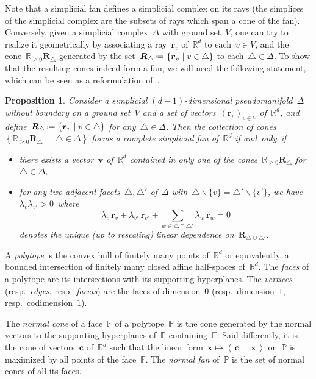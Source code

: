 \documentclass{amsart}
\newtheorem{proposition}[theorem]{Proposition}
\theoremstyle{definition}
\newcommand{\R}{\mathbb{R}} %
\renewcommand{\b}[1]{{\boldsymbol{#1}}} %
\newcommand{\set}[2]{\left\{ #1 \;\middle|\; #2 \right\}} %
\newcommand{\ssm}{\smallsetminus} %
\newcommand{\dotprod}[2]{\left\langle \, #1 \; \middle| \; #2 \, \right\rangle} %
\newcommand{\eqdef}{\mbox{\,\raisebox{0.2ex}{\scriptsize\ensuremath{\mathrm:}}\ensuremath{=}\,}} %
\newcommand{\darkblue}{\color{darkblue}} %
\newcommand{\defn}[1]{\textsl{\darkblue #1}} %
\newcommand{\polytope}[1]{\mathds{#1}} %
\begin{document}
Note that a simplicial fan defines a simplicial complex on its rays (the simplices of the simplicial complex are the subsets of rays which span a cone of the fan).
Conversely, given a simplicial complex~$\Delta$ with ground set~$V$, one can try to realize it geometrically by associating a ray~$\b{r}_v$ of~$\R^d$ to each~$v \in V$, and the cone~$\R_{\ge 0}\b{R}_\triangle$ generated by the set~$\b{R}_\triangle \eqdef \set{\b{r}_v}{v \in \triangle}$ to each~$\triangle \in \Delta$.
To show that the resulting cones indeed form a fan, we will need the following statement, which can be seen as a reformulation of~\cite[Coro.~4.5.20]{DeLoeraRambauSantos}.

\begin{proposition}
\label{prop:characterizationFan}
Consider a simplicial $(d-1)$-dimensional pseudomanifold~$\Delta$ without boundary on a ground set~$V$ and a set of vectors~$(\b{r}_v)_{v \in V}$ of~$\R^d$, and define~$\b{R}_\triangle \eqdef \set{\b{r}_v}{v \in \triangle}$ for any~$\triangle \in \Delta$.
Then the collection of cones~$\set{\R_{\ge 0}\b{R}_\triangle}{\triangle \in \Delta}$ forms a complete simplicial fan of~$\R^d$ if and~only~if
\begin{itemize}
\item there exists a vector~$\b{v}$ of~$\R^d$ contained in only one of the cones~$\R_{\ge 0}\b{R}_\triangle$ for~$\triangle \in \Delta$,
\item for any two adjacent facets~$\triangle, \triangle'$ of~$\Delta$ with~$\triangle \ssm \{v\} = \triangle' \ssm \{v'\}$, we have~$\lambda_v \lambda_{v'} > 0$~where
\[
\lambda_v \, \b{r}_v + \lambda_{v'} \, \b{r}_{v'} + \sum_{w \in \triangle \cap \triangle'} \lambda_w \, \b{r}_w = 0
\]
denotes the unique (up to rescaling) linear dependence on~$\b{R}_{\triangle \cup \triangle'}$.
\end{itemize}
\end{proposition}

A \defn{polytope} is the convex hull of finitely many points of~$\R^d$ or equivalently, a bounded intersection of finitely many closed affine half-spaces of~$\R^d$.
The \defn{faces} of a polytope are its intersections with its supporting hyperplanes.
The \defn{vertices} (resp.~\defn{edges}, resp.~\defn{facets}) are the faces of dimension~$0$ (resp.~dimension~$1$, resp.~codimension~$1$).

The \defn{normal cone} of a face~$\polytope{F}$ of a polytope~$\polytope{P}$ is the cone generated by the normal vectors to the supporting hyperplanes of~$\polytope{P}$ containing~$\polytope{F}$.
Said differently, it is the cone of vectors~$\b{c}$ of~$\R^d$ such that the linear form~$\b{x} \mapsto \dotprod{\b{c}}{\b{x}}$ on~$\polytope{P}$ is maximized by all points of the face~$\polytope{F}$.
The \defn{normal fan} of~$\polytope{P}$ is the set of normal cones of all its faces.
\end{document}
